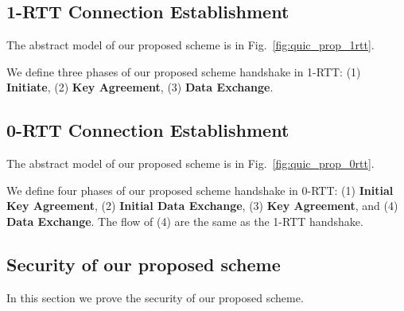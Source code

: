 \subsection{1-RTT Connection Establishment} \label{sec:quic_prop_1rtt}

The abstract model of our proposed scheme is in
Fig.~\ref{fig:quic_prop_1rtt}.



We define three phases of our proposed scheme handshake in 1-RTT:
(1) \textbf{Initiate},
(2) \textbf{Key Agreement},
(3) \textbf{Data Exchange}.





\subsection{0-RTT Connection Establishment} \label{sec:quic_prop_0rtt}

The abstract model of our proposed scheme is in
Fig.~\ref{fig:quic_prop_0rtt}.



We define four phases of our proposed scheme handshake in 0-RTT:
(1) \textbf{Initial Key Agreement},
(2) \textbf{Initial Data Exchange},
(3) \textbf{Key Agreement}, and
(4) \textbf{Data Exchange}.
The flow of (4) are the same as the 1-RTT
handshake.





\subsection{Security of our proposed scheme} \label{sec:quic_proof}

In this section we prove the security of our proposed scheme.


